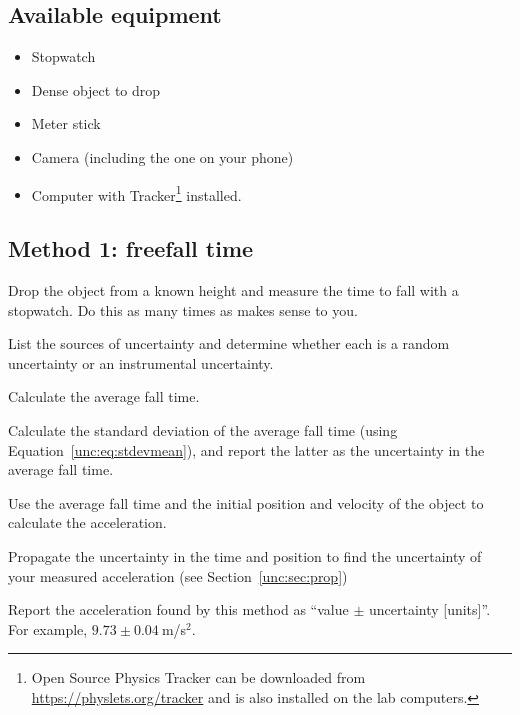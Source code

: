 \subsection{Available equipment}

\begin{itemize}

	\item Stopwatch
	\item Dense object to drop
	\item Meter stick
	\item Camera (including the one on your phone)
	\item Computer with Tracker\footnote{Open Source Physics Tracker can be downloaded from \url{https://physlets.org/tracker} and is also installed on the lab computers.} installed.

\end{itemize}

\subsection{Method 1: freefall time}

\begin{steps}
	\item Drop the object from a known height and measure the time to fall with a stopwatch. Do this as many times as makes sense to you.
	
	\item List the sources of uncertainty and determine whether each is a random uncertainty or an instrumental uncertainty.
	
	\item Calculate the average fall time.
	
	\item Calculate the standard deviation of the average fall time (using Equation~\ref{unc:eq:stdevmean}), and report the latter as the uncertainty in the average fall time.
	
	\item Use the average fall time and the initial position and velocity of the object to calculate the acceleration.
	
	\item Propagate the uncertainty in the time and position to find the uncertainty of your measured acceleration (see Section~\ref{unc:sec:prop})
	
	\item Report the acceleration found by this method as ``value $\pm$ uncertainty [units]''. For example, $9.73 \pm 0.04\:$m/s$^2$.
\end{steps}

